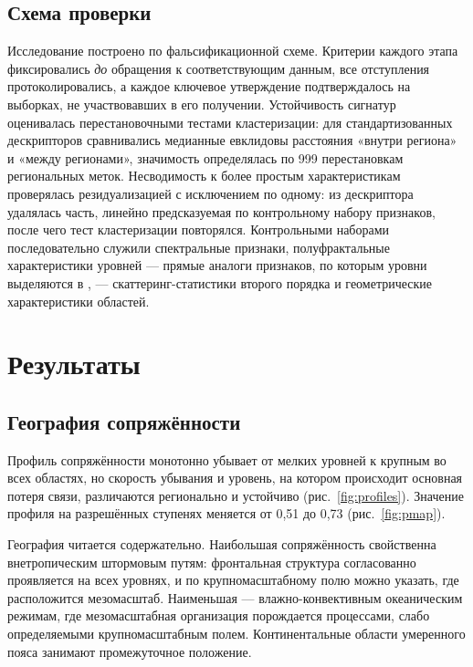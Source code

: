 \documentclass[11pt,a4paper]{article}
\begin{document}
\subsection{Схема проверки}

Исследование построено по фальсификационной схеме. Критерии каждого этапа фиксировались \emph{до} обращения к соответствующим данным, все отступления протоколировались, а каждое ключевое утверждение подтверждалось на выборках, не участвовавших в его получении. Устойчивость сигнатур оценивалась перестановочными тестами кластеризации: для стандартизованных дескрипторов сравнивались медианные евклидовы расстояния «внутри региона» и «между регионами», значимость определялась по 999 перестановкам региональных меток. Несводимость к более простым характеристикам проверялась резидуализацией с исключением по одному: из дескриптора удалялась часть, линейно предсказуемая по контрольному набору признаков, после чего тест кластеризации повторялся. Контрольными наборами последовательно служили спектральные признаки, полуфрактальные характеристики уровней --- прямые аналоги признаков, по которым уровни выделяются в \cite{Krenke2019}, --- скаттеринг-статистики второго порядка \cite{Cheng2024} и геометрические характеристики областей.

\section{Результаты}
\label{sec:results}

\subsection{География сопряжённости}

Профиль сопряжённости монотонно убывает от мелких уровней к крупным во всех областях, но скорость убывания и уровень, на котором происходит основная потеря связи, различаются регионально и устойчиво (рис.~\ref{fig:profiles}). Значение профиля на разрешённых ступенях меняется от 0,51 до 0,73 (рис.~\ref{fig:pmap}).

География читается содержательно. Наибольшая сопряжённость свойственна внетропическим штормовым путям: фронтальная структура согласованно проявляется на всех уровнях, и по крупномасштабному полю можно указать, где расположится мезомасштаб. Наименьшая --- влажно-конвективным океаническим режимам, где мезомасштабная организация порождается процессами, слабо определяемыми крупномасштабным полем. Континентальные области умеренного пояса занимают промежуточное положение.
\end{document}
